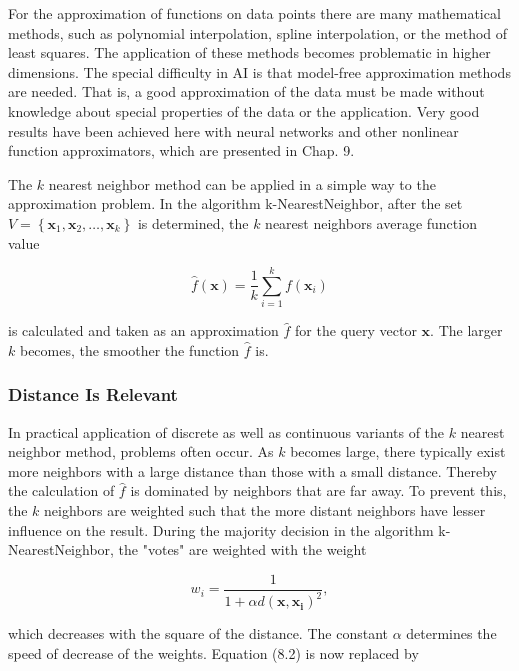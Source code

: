 \documentclass[10pt]{book}
\begin{document}
For the approximation of functions on data points there are many mathematical methods, such as polynomial interpolation, spline interpolation, or the method of least squares. The application of these methods becomes problematic in higher dimensions. The special difficulty in AI is that model-free approximation methods are needed. That is, a good approximation of the data must be made without knowledge about special properties of the data or the application. Very good results have been achieved here with neural networks and other nonlinear function approximators, which are presented in Chap. 9.

The $k$ nearest neighbor method can be applied in a simple way to the approximation problem. In the algorithm k-NearestNeighbor, after the set $V=\left\{\boldsymbol{x}_{1}, \boldsymbol{x}_{2}, \ldots, \boldsymbol{x}_{k}\right\}$ is determined, the $k$ nearest neighbors average function value


\begin{equation*}
\hat{f}(\boldsymbol{x})=\frac{1}{k} \sum_{i=1}^{k} f\left(\boldsymbol{x}_{i}\right) \tag{8.2}
\end{equation*}


is calculated and taken as an approximation $\hat{f}$ for the query vector $\boldsymbol{x}$. The larger $k$ becomes, the smoother the function $\hat{f}$ is.

\subsubsection*{Distance Is Relevant}
In practical application of discrete as well as continuous variants of the $k$ nearest neighbor method, problems often occur. As $k$ becomes large, there typically exist more neighbors with a large distance than those with a small distance. Thereby the calculation of $\hat{f}$ is dominated by neighbors that are far away. To prevent this, the $k$ neighbors are weighted such that the more distant neighbors have lesser influence on the result. During the majority decision in the algorithm k-NearestNeighbor, the "votes" are weighted with the weight


\begin{equation*}
w_{i}=\frac{1}{1+\alpha d\left(\boldsymbol{x}, \boldsymbol{x}_{\boldsymbol{i}}\right)^{2}}, \tag{8.3}
\end{equation*}


which decreases with the square of the distance. The constant $\alpha$ determines the speed of decrease of the weights. Equation (8.2) is now replaced by
\end{document}
